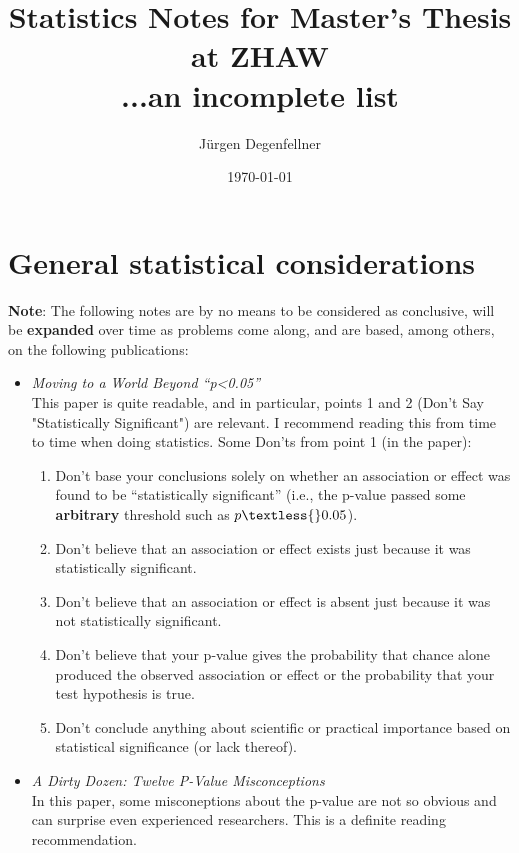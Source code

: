 \documentclass[12pt,a4paper]{article}
\title{Statistics Notes for Master's Thesis at ZHAW\\
...an incomplete list}
\author{Jürgen Degenfellner}
\date{\today}
\begin{document}
\maketitle

\section{General statistical considerations}

\noindent \textbf{Note}: The following notes are by no means to be considered as conclusive, will be \textbf{expanded} over time as problems come along, and are based, among others, on the following publications:

\begin{itemize}

\item \textit{Moving to a World Beyond “p\textless{}0.05”} \cite{Wasserstein2019}\\
This paper is quite readable, and in particular, points 1 and 2 (Don't Say "Statistically Significant") are relevant. I recommend reading this from time to time when doing statistics. Some Don'ts from point 1 (in the paper):
    \begin{enumerate}
        \item Don’t base your conclusions solely on whether an association or effect was found to be “statistically significant” (i.e., the p-value passed some \textbf{arbitrary} threshold such as \( p \textless{} 0.05 \)).
        \item Don’t believe that an association or effect exists just because it was statistically significant.
        \item Don’t believe that an association or effect is absent just because it was not statistically significant.
        \item Don’t believe that your p-value gives the probability that chance alone produced the observed association or effect or the probability that your test hypothesis is true.
        \item Don’t conclude anything about scientific or practical importance based on statistical significance (or lack thereof).
    \end{enumerate}

\item \textit{A Dirty Dozen: Twelve P-Value Misconceptions} \cite{Goodman2008}\\
In this paper, some misconeptions about the p-value are not so obvious and can surprise even experienced researchers. This is a definite reading recommendation.


\end{itemize}
\end{document}
